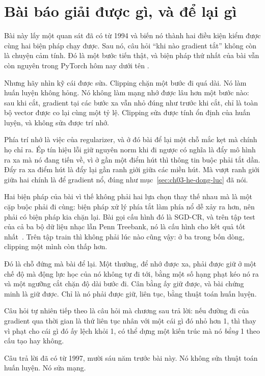 \section{Bài báo giải được gì, và để lại gì}
\label{sec:ch03-con-lai-gi}

%
Bài này lấy một quan sát đã có từ 1994 và biến nó thành hai điều kiện kiểm được
cùng hai biện pháp chạy được. Sau nó, câu hỏi \enquote{khi nào gradient tắt}
không còn là chuyện cảm tính. Đó là một bước tiến thật, và biện pháp thứ nhất
của bài vẫn còn nguyên trong PyTorch hôm nay dưới tên
.

Nhưng hãy nhìn kỹ cái được sửa. Clipping chặn một bước đi quá dài. Nó làm huấn
luyện không hỏng. Nó không làm mạng nhớ được lâu hơn một bước nào: sau khi cắt,
gradient tại các bước xa vẫn nhỏ đúng như trước khi cắt, chỉ là toàn bộ vector
được co lại cùng một tỷ lệ. Clipping sửa được tính ổn định của huấn luyện, và
không sửa được trí nhớ.

Phía trí nhớ là việc của regularizer, và ở đó bài để lại một chỗ mắc kẹt mà
chính họ chỉ ra. Ép tín hiệu lỗi giữ nguyên norm khi đi ngược có nghĩa là đẩy
mô hình ra xa  mà nó đang tiến về, vì ở gần một điểm hút thì thông tin
buộc phải tắt dần. Đẩy ra xa điểm hút là đẩy lại gần ranh giới giữa các miền
hút. Mà vượt ranh giới giữa hai  chính là  để gradient nổ,
đúng như mục~\ref{sec:ch03-he-dong-luc} đã nói.

Hai biện pháp của bài vì thế không phải hai lựa chọn thay thế nhau mà là một
cặp buộc phải đi cùng: biện pháp xử lý phía tắt làm phía nổ dễ xảy ra hơn, nên
phải có biện pháp kia chặn lại. Bài gọi cấu hình đó là SGD-CR, và trên tập
test của cả ba bộ dữ liệu nhạc lẫn Penn Treebank, nó là cấu hình cho kết quả tốt
nhất~\autocite{pascanu2013difficulty}. Trên tập train thì không phải lúc nào cũng
vậy: ở ba trong bốn dòng, clipping một mình còn thấp hơn.

Đó là chỗ đứng mà bài để lại. Một 
thường, để nhớ được xa, phải
được giữ ở một chế độ mà động lực học của nó không tự đi tới, bằng một số hạng
phạt kéo nó ra và một ngưỡng cắt chặn độ dài bước đi. Cân bằng ấy giữ được, và
bài chứng minh là giữ được. Chỉ là nó phải được giữ, liên tục, bằng thuật toán
huấn luyện.

Câu hỏi tự nhiên tiếp theo là câu hỏi mà chương sau trả lời: nếu đường đi của
gradient qua thời gian là thứ liên tục nhân với một cái gì đó nhỏ hơn 1, thì
thay vì phạt cho cái gì đó ấy lệch khỏi 1, có thể dựng một kiến trúc mà nó
\emph{bằng} 1 theo cấu tạo hay không.

Câu trả lời đã có từ 1997, mười sáu năm trước bài này. Nó không sửa thuật
toán huấn luyện. Nó sửa mạng.
